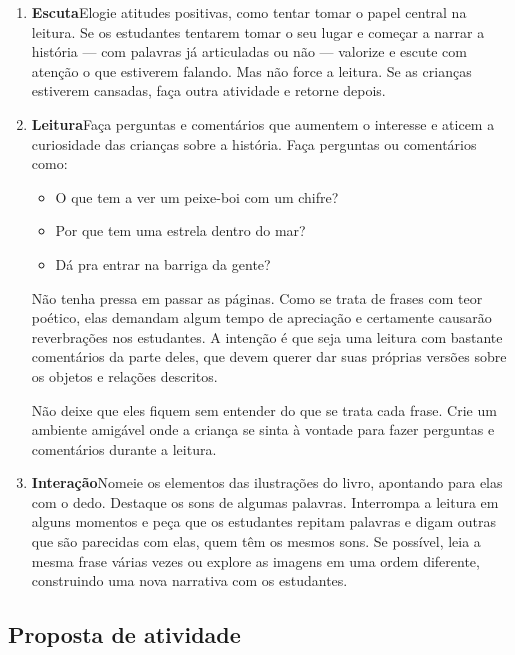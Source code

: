 \documentclass[11pt]{extarticle}
\begin{document}
\begin{enumerate}
\item \textbf{Escuta}\quad Elogie atitudes positivas, como 
tentar tomar o papel central na leitura. Se os estudantes tentarem 
tomar o seu lugar e começar a narrar a história --- com palavras já articuladas 
ou não --- valorize e escute com atenção o que estiverem falando. Mas não 
force a leitura. Se as crianças estiverem cansadas, faça outra atividade 
e retorne depois. 

\item \textbf{Leitura}\quad Faça perguntas e comentários que aumentem o 
interesse e aticem a curiosidade das crianças sobre a história. Faça 
perguntas ou comentários como: 

\begin{itemize}
\item O que tem a ver um peixe-boi com um chifre?
\item Por que tem uma estrela dentro do mar?
\item Dá pra entrar na barriga da gente?
\end{itemize}

Não tenha pressa em passar as páginas. Como se trata de frases 
com teor poético, elas demandam algum tempo de apreciação
e certamente causarão reverbrações nos estudantes. 
A intenção é que seja uma leitura com bastante comentários
da parte deles, que devem querer dar suas próprias versões
sobre os objetos e relações descritos.  

Não deixe que eles fiquem sem entender do que se trata cada frase. Crie 
um ambiente amigável onde a criança se sinta à vontade para fazer 
perguntas e comentários durante a leitura.


\item \textbf{Interação}\quad Nomeie os elementos das ilustrações 
do livro, apontando para elas com o dedo. Destaque os sons de algumas 
palavras. Interrompa a leitura em alguns momentos e peça que 
os estudantes repitam palavras e digam outras que são parecidas com elas,
quem têm os mesmos sons. Se possível, 
leia a mesma frase várias vezes ou explore as imagens em uma ordem 
diferente, construindo uma nova narrativa com os estudantes. 

\end{enumerate}


\subsection{Proposta de atividade}
\end{document}
